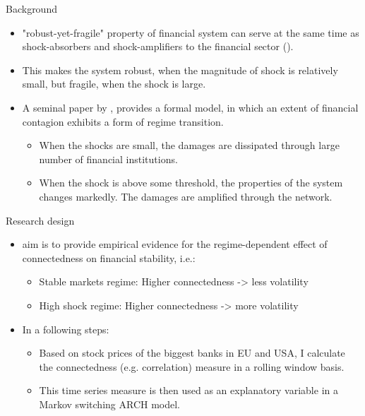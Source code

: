 \documentclass{beamer}
\begin{document}
\begin{frame}{Background}   
\begin{itemize}
    \item "robust-yet-fragile" property of financial system can serve at the same time as shock-absorbers and shock-amplifiers to the financial sector (\cite{haldane}).
    \item This makes the system robust, when the magnitude of shock is relatively small, but fragile, when the shock is large. 
    \item A seminal paper by \cite{acemoglu}, provides a formal model, in which an extent of financial contagion exhibits a form of regime transition.
        \begin{itemize}
            \item When the shocks are small, the damages are dissipated through large number of financial institutions.
            \item When the shock is above some threshold, the properties of the system changes markedly. The damages are amplified through the network.
        \end{itemize}

\end{itemize}

\end{frame}

\begin{frame}{Research design}

\begin{itemize}
    \item aim is to provide empirical evidence for the regime-dependent effect of connectedness on financial stability, i.e.:
    \begin{itemize}
        \item Stable markets regime: Higher connectedness -> less volatility
        \item High shock regime: Higher connectedness -> more volatility
    \end{itemize}
    \item In a following steps:
    \begin{itemize}
        \item Based on stock prices of the biggest banks in EU and USA, I calculate the connectedness (e.g. correlation) measure in a rolling window basis.
        \item This time series measure is then used as an explanatory variable in a Markov switching ARCH model.    
    \end{itemize}
\end{itemize}

\end{frame}    
\end{document}
